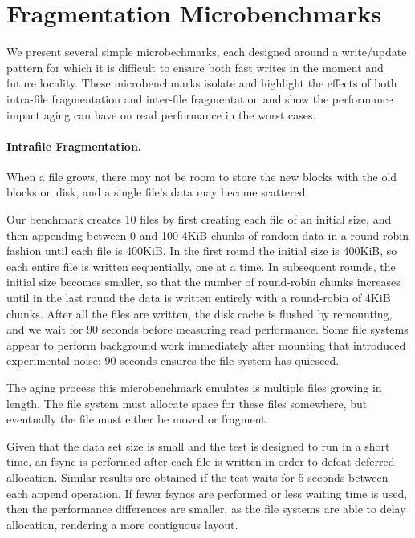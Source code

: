 \section{Fragmentation Microbenchmarks}\label{sec:fsa-microbenchmarks}

We present several simple microbechmarks, each designed around a write/update
pattern for which it is difficult to ensure both fast writes in the moment and
future locality.  These microbenchmarks isolate and highlight the effects of
both intra-file fragmentation and inter-file fragmentation and show the
performance impact aging can have on read performance in the worst cases.

\paragraph{Intrafile Fragmentation.} When a file grows, there may not be room
to store the new blocks with the old blocks on disk, and a single file's data
may become scattered.  

Our benchmark creates 10 files by first creating each file of an initial size,
and then appending between 0 and 100 4KiB chunks of random data in a
round-robin fashion until each file is 400KiB.  In the first round the initial
size is 400KiB, so each entire file is written sequentially, one at a time. In
subsequent rounds, the initial size becomes smaller, so that the number of
round-robin chunks increases until in the last round the data is written
entirely with a round-robin of 4KiB chunks. After all the files are written,
the disk cache is flushed by remounting, and we wait for 90 seconds before
measuring read performance.  Some file systems appear to perform background
work immediately after mounting that introduced experimental noise; 90 seconds
ensures the file system has quiesced.

The aging process this microbenchmark emulates is multiple files growing in
length. The file system must allocate space for these files somewhere, but
eventually the file must either be moved or fragment.

Given that the data set size is small and the test is designed to run in a
short time, an fsync is performed after each file is written in order to defeat
deferred allocation. Similar results are obtained if the test waits for 5
seconds between each append operation. If fewer fsyncs are performed or less
waiting time is used, then the performance differences are smaller, as the file
systems are able to delay allocation, rendering a more contiguous layout.

